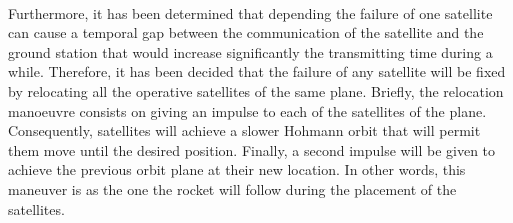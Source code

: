 \paragraph{}Furthermore, it has been determined that depending the failure of one satellite can cause a temporal gap between the communication of the satellite and the ground station that would increase significantly the transmitting time during a while. Therefore, it has been decided that the failure of any satellite will be fixed by relocating all the operative satellites of the same plane. Briefly, the relocation manoeuvre consists on giving an impulse to each of the satellites of the plane. Consequently, satellites will achieve a slower Hohmann orbit that will permit them move until the desired position. Finally, a second impulse will be given to achieve the previous orbit plane at their new location. In other words, this maneuver is as the one the rocket will follow during the placement of the satellites. 
